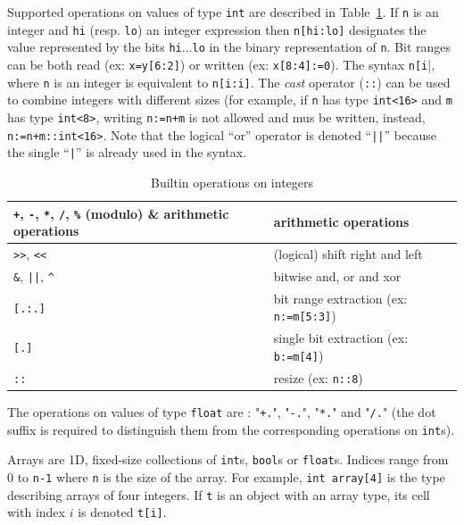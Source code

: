 \step Supported operations on values of type \texttt{int} are described in Table~\ref{tab:int-ops}.
If \verb|n| is an integer and \verb|hi| (resp. \verb|lo|) an integer expression then \verb|n[hi:lo]|
designates the value represented by the bits \verb|hi|...\verb|lo| in the binary representation of
\verb|n|. Bit ranges can be both read (ex: \verb|x=y[6:2]|) or written (ex: \verb|x[8:4]:=0|). The
syntax \verb|n[i||, where \verb|n| is an integer is equivalent to \verb|n[i:i]|. The \emph{cast}
operator (\verb|::|) can be used to combine integers with different sizes (for example, if \verb|n|
has type \verb|int<16>| and \verb|m| has type \verb|int<8>|, writing \verb|n:=n+m| is not allowed
and mus be written, instead, \verb|n:=n+m::int<16>|. Note that the
logical ``or'' operator is denoted ``\verb+||+'' because the single ``\verb+|+'' is already used in
the syntax.

\begin{table}
\begin{center}
\begin{tabular}{|l|l|} \hline
\verb|+|, \verb|-|, \verb|*|, \verb|/|, \verb|%| (modulo) & arithmetic operations \\ \hline 
\verb|>>|, \verb|<<| & (logical) shift right and left \\ \hline 
\verb|&|, \verb+||+, \verb|^| & bitwise and, or and xor \\ \hline 
\verb|[.:.]| & bit range extraction (ex: \verb|n:=m[5:3]|) \\ \hline 
\verb|[.]| & single bit extraction (ex: \verb|b:=m[4]|) \\ \hline 
\verb|::| & resize (ex: \verb|n::8|) \\ \hline 
\end{tabular}
\caption{\label{tab:int-ops}Builtin operations on integers}
\end{center}
\end{table}

\step The operations on values of type \texttt{float} are : "\verb|+.|", "\verb|-.|", "\verb|*.|" and
"\verb|/.|" (the dot suffix is required to distinguish them from the corresponding operations on
\texttt{int}s).


\step Arrays are 1D, fixed-size collections of \verb|int|s, \verb|bool|s or \verb|float|s. Indices
range from 0 to \verb|n-1| where \verb|n| is the size of the array. For example,
 \verb|int array[4]| is the type describing arrays of four integers. If \verb|t| is an object
  with an array type, its cell with index $i$ is denoted \verb|t[i]|.


